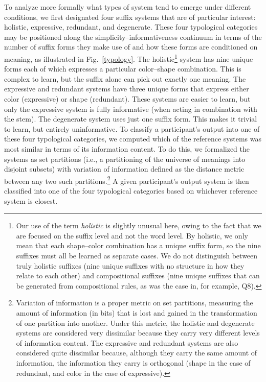 \documentclass[doc,biblatex]{apa7}
\begin{document}
To analyze more formally what types of system tend to emerge under different conditions, we first designated four suffix systems that are of particular interest: holistic, expressive, redundant, and degenerate. These four typological categories may be positioned along the simplicity--informativeness continuum in terms of the number of suffix forms they make use of and how these forms are conditioned on meaning, as illustrated in Fig.~\ref{typology}. The holistic\footnote{Our use of the term \textit{holistic} is slightly unusual here, owing to the fact that we are focused on the suffix level and not the word level. By holistic, we only mean that each shape--color combination has a unique suffix form, so the nine suffixes must all be learned as separate cases. We do not distinguish between truly holistic suffixes (nine unique suffixes with no structure in how they relate to each other) and compositional suffixes (nine unique suffixes that can be generated from compositional rules, as was the case in, for example, Q8).} system has nine unique forms each of which expresses a particular color--shape combination. This is complex to learn, but the suffix alone can pick out exactly one meaning. The expressive and redundant systems have three unique forms that express either color (expressive) or shape (redundant). These systems are easier to learn, but only the expressive system is fully informative (when acting in combination with the stem). The degenerate system uses just one suffix form. This makes it trivial to learn, but entirely uninformative. To classify a participant's output into one of these four typological categories, we computed which of the reference systems was most similar in terms of its information content. To do this, we formalized the systems as set partitions (i.e., a partitioning of the universe of meanings into disjoint subsets) with variation of information \parencite{Meila:2007} defined as the distance metric between any two such partitions.\footnote{Variation of information is a proper metric on set partitions, measuring the amount of information (in bits) that is lost and gained in the transformation of one partition into another. Under this metric, the holistic and degenerate systems are considered very dissimilar because they carry very different levels of information content. The expressive and redundant systems are also considered quite dissimilar because, although they carry the same amount of information, the information they carry is orthogonal (shape in the case of redundant, and color in the case of expressive).} A given participant's output system is then classified into one of the four typological categories based on whichever reference system is closest.
\end{document}
